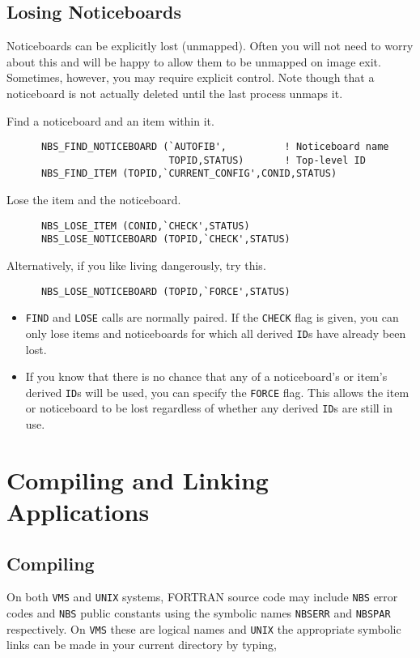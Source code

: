 \documentclass[twoside,11pt]{article}
\renewcommand{\_}{\texttt{\symbol{95}}}
\begin{document}
\subsection {Losing Noticeboards}

Noticeboards can be explicitly lost (unmapped). Often you will not need to
worry about this and will be happy to allow them to be unmapped on image exit.
Sometimes, however, you may require explicit control. Note though that a
noticeboard is not actually deleted until the last process unmaps it.

Find a noticeboard and an item within it.

\begin{verbatim}
      NBS_FIND_NOTICEBOARD (`AUTOFIB',          ! Noticeboard name
                            TOPID,STATUS)       ! Top-level ID
      NBS_FIND_ITEM (TOPID,`CURRENT_CONFIG',CONID,STATUS)
\end{verbatim}

Lose the item and the noticeboard.

\begin{verbatim}
      NBS_LOSE_ITEM (CONID,`CHECK',STATUS)
      NBS_LOSE_NOTICEBOARD (TOPID,`CHECK',STATUS)
\end{verbatim}

Alternatively, if you like living dangerously, try this.

\begin{verbatim}
      NBS_LOSE_NOTICEBOARD (TOPID,`FORCE',STATUS)
\end{verbatim}

\begin{itemize}
\item {\tt FIND} and {\tt LOSE} calls are normally paired. If the {\tt CHECK}
flag is given, you can only lose items and noticeboards for which all derived
{\tt ID}s have already been lost.
\item If you know that there is no chance that any of a noticeboard's or item's
derived {\tt ID}s will be used, you can specify the {\tt FORCE} flag. This
allows the item or noticeboard to be lost regardless of whether any derived
{\tt ID}s are still in use.
\end{itemize}

\section {Compiling and Linking Applications}

\subsection{Compiling}
On both {\tt VMS} and {\tt UNIX} systems, FORTRAN source code may
include {\tt NBS} error codes and {\tt NBS} public constants using
the symbolic names {\tt NBS\_ERR} and {\tt NBS\_PAR} respectively. 
On {\tt VMS} these are logical names and {\tt UNIX} the appropriate
symbolic links can be made in your current directory by typing,
\end{document}
